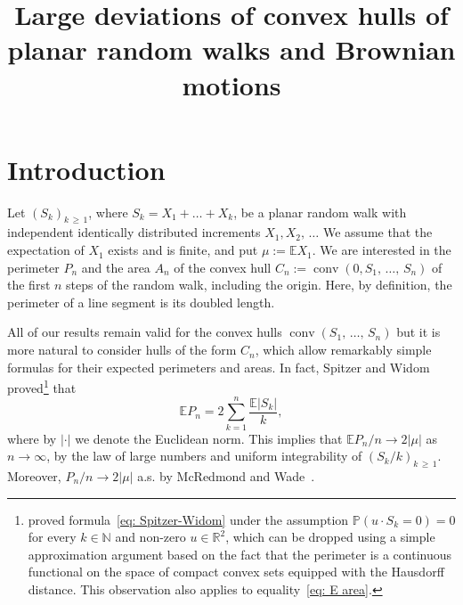 \documentclass[AHL,Unicode,published]{cedram}
\title[Large deviations of convex hulls of planar random walks]{Large deviations of convex hulls of planar random walks and Brownian motions}
\author[\initial{A.} \lastname{Akopyan}]{\firstname{Arseniy} \lastname{Akopyan}}
\author[\initial{V.} \lastname{Vysotsky}]{\firstname{Vladislav} \lastname{Vysotsky}}
\DeclareMathOperator{\conv}{conv}
\newcommand{\Rbb}{\mathbb{R}}
\newcommand{\N}{\mathbb{N}}
\newcommand{\E}{\mathbb{E}}
\newcommand{\Pbb}{\mathbb{P}}
\begin{document}
\maketitle

\section{Introduction} \label{Sec: intro}
Let $(S_k)_{k\,\ge\,1}$, where $S_k = X_1 + \ldots + X_k$, be a planar random walk with independent identically distributed increments $X_1, X_2,\,\ldots$ We assume that the expectation of $X_1$ exists and is finite, and put $\mu := \E X_1$. We are interested in the perimeter $P_n$ and the area $A_n$ of the convex hull $C_n:=\conv(0, S_1,\,\dots,\,S_n)$ of the first $n$ steps of the random walk, including the origin. Here, by definition, the perimeter of a line segment is its doubled length.

All of our results remain valid for the convex hulls $\conv(S_1,\,\dots,\,S_n)$ but it is more natural to consider hulls of the form $C_n$, which allow remarkably simple formulas for their expected perimeters and areas. In fact, Spitzer and Widom~\cite{SpitzerWidom} proved\footnote{\cite{SpitzerWidom} proved formula~\eqref{eq: Spitzer-Widom} under the assumption $\Pbb(u \cdot S_k=0)=0$ for every $k \in \N$ and non-zero $u \in \Rbb^2$, which can be dropped using a simple approximation argument based on the fact that the perimeter is a continuous functional on the space of compact convex sets equipped with the Hausdorff distance. This observation also applies to equality~\eqref{eq: E area}.} that
\begin{equation}\label{eq: Spitzer-Widom}
\E P_n = 2 \sum_{k=1}^n \frac{\E |S_k|}{k},
\end{equation}
where by $|\cdot|$ we denote the Euclidean norm. This implies that $\E P_n/n \to 2 |\mu|$ as $n \to \infty$, by the law of large numbers and uniform integrability of $(S_k/k)_{k\,\ge\,1}$. Moreover, $P_n/n \to 2|\mu|$ a.s. by McRedmond and Wade~\cite{McRedmondWade}.
\end{document}
